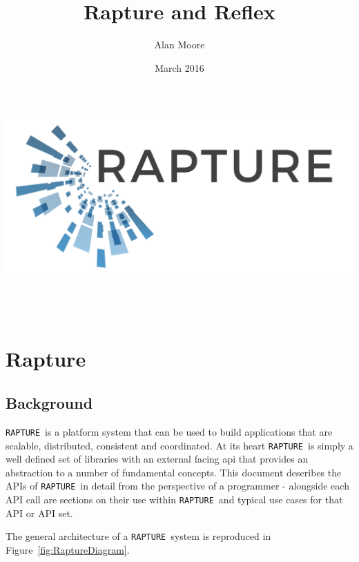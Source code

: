 \documentclass[12pt,twoside,a4paper]{book}
\newcommand{\Rapture}{\Verb+RAPTURE+~}
\begin{document}
\title{Rapture and Reflex}
\author{Alan Moore}
\date{March 2016}

\makeatletter
    \begin{titlepage}
      \includegraphics[width=0.7\linewidth]{Graphics/RaptureLogo.png}\\[4ex]
        \begin{center}
            {\huge \bfseries  \@title }\\[2ex]
            {\LARGE  \@author}\\[50ex]
            {\large \@date}
        \end{center}
    \end{titlepage}
\makeatother
\thispagestyle{empty}
\newpage


\setcounter{tocdepth}{1}
\tableofcontents
\setcounter{page}{1} %


\part{Rapture}
\chapter{Background}
\Rapture is a platform system that can be used to build applications that are scalable,
distributed, consistent and coordinated. At its heart \Rapture is simply a well defined
set of libraries with an external facing api that provides an abstraction to a number
of fundamental concepts. This document describes the APIs of \Rapture in detail from the
perspective of a programmer - alongside each API call are sections on their use within
\Rapture and typical use cases for that API or API set.

The general architecture of a \Rapture system is reproduced in Figure~\vref{fig:RaptureDiagram}.
\end{document}
